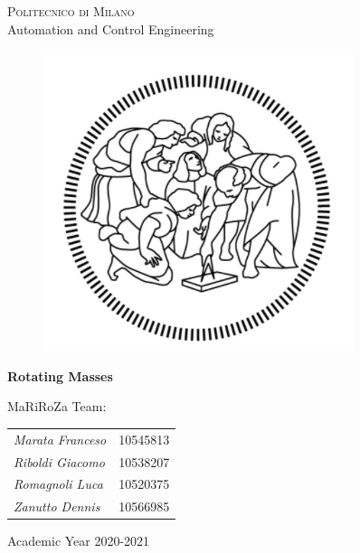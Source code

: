 \documentclass{report}
\begin{document}
	
	
	\thispagestyle{empty}
	\enlargethispage{60mm}
	\begin{center}
		\Large{\textsc{Politecnico di Milano}}\\
		
		\large{Automation and Control Engineering}\\
		\vspace{7mm}
		\begin{figure}[h]
			\begin{center}
				\includegraphics[scale=1]{polimi_logo}
			\end{center}
		\end{figure}
		\vspace{10mm}
		
		\begin{LARGE}
			\bf Rotating Masses
		\end{LARGE}
		\vspace{60mm}
		
		\begin{flushleft}
			MaRiRoZa Team:
			\newline
			\newline
			\begin{tabular}{ll}
				\textit{Marata Franceso} & 10545813 \\
				\textit{Riboldi Giacomo} & 10538207 \\
				\textit{Romagnoli Luca} & 10520375 \\
				\textit{Zanutto Dennis} & 10566985 \\
			\end{tabular}
		\end{flushleft}
		\vspace{15mm}
		
		
		\vspace{25mm}
		{\large{Academic Year 2020-2021}}
	\end{center}
	
\end{document}
